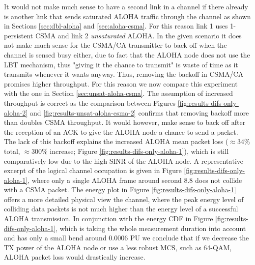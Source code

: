 It would not make much sense to have a second link in a channel if there already is another link that sends saturated ALOHA traffic through the channel as shown in Sections \ref{sec:dbl-aloha} and \ref{sec:aloha-csma}. For this reason link 1 uses 1-persistent CSMA and link 2 \emph{unsaturated} ALOHA. In the given scenario it does not make much sense for the CSMA/CA transmitter to back off when the channel is sensed busy either, due to fact that the ALOHA node does not use the LBT mechanism, thus "giving it the chance to transmit" is waste of time as it transmits whenever it wants anyway. Thus, removing the backoff in CSMA/CA promises higher throughput. For this reason we now compare this experiment with the one in Section \ref{sec:unsat-aloha-csma}. The assumption of increased throughput is correct as the comparison between Figures \ref{fig:results-difs-only-aloha-2} and \ref{fig:results-unsat-aloha-csma-2} confirms that removing backoff more than doubles CSMA throughput. It would however, make sense to back off after the reception of an ACK to give the ALOHA node a chance to send a packet. The lack of this backoff explains the increased ALOHA mean packet loss ($\approx 34\%$ total, $\approx 300\%$ increase;  Figure \ref{fig:results-difs-only-aloha-1}), which is still comparatively low due to the high SINR of the ALOHA node. A representative excerpt of the logical channel occupation is given in Figure \ref{fig:results-difs-only-aloha-1}, where only a single ALOHA frame around second 8.8 does not collide with a CSMA packet. The energy plot in Figure  \ref{fig:results-difs-only-aloha-1} offers a more detailed physical view the channel, where the peak energy level of colliding data packets is not much higher than the energy level of a successful ALOHA transmission. In conjunction with the energy CDF in Figure \ref{fig:results-difs-only-aloha-1}, which is taking the whole measurement duration into account and has only a small bend around 0.0006 PU we conclude that if we decrease the TX power of the ALOHA node or use a less robust MCS, such as 64-QAM, ALOHA packet loss would drastically increase. 

